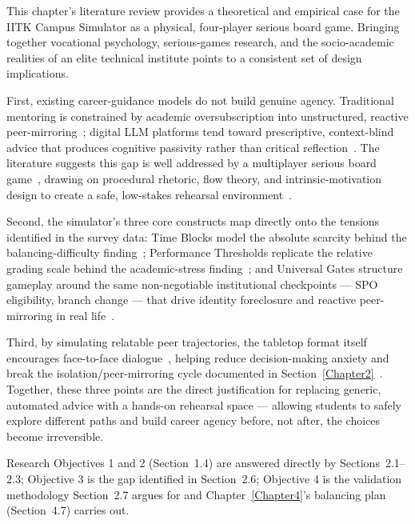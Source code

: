This chapter's literature review provides a theoretical and empirical case for the IITK Campus Simulator as a physical, four-player serious board game. Bringing together vocational psychology, serious-games research, and the socio-academic realities of an elite technical institute points to a consistent set of design implications.

First, existing career-guidance models do not build genuine agency. Traditional mentoring is constrained by academic oversubscription into unstructured, reactive peer-mirroring~\cite{Chandrasekera-2024, Yasar-2026}; digital LLM platforms tend toward prescriptive, context-blind advice that produces cognitive passivity rather than critical reflection~\cite{Yatani-2024, Du-2024}. The literature suggests this gap is well addressed by a multiplayer serious board game~\cite{Bayeck-2020, Booth-2019}, drawing on procedural rhetoric, flow theory, and intrinsic-motivation design to create a safe, low-stakes rehearsal environment~\cite{Bayeck-2020, Csikszentmihalyi-1990, Malone-1981}.

Second, the simulator's three core constructs map directly onto the tensions identified in the survey data: Time Blocks model the absolute scarcity behind the balancing-difficulty finding~\cite{Maji-2024}; Performance Thresholds replicate the relative grading scale behind the academic-stress finding~\cite{Maji-2024}; and Universal Gates structure gameplay around the same non-negotiable institutional checkpoints --- SPO eligibility, branch change --- that drive identity foreclosure and reactive peer-mirroring in real life~\cite{Maji-2024, Afreen-2022, Chandrasekera-2024}.

Third, by simulating relatable peer trajectories, the tabletop format itself encourages face-to-face dialogue~\cite{Pace-2025, Bayeck-2020}, helping reduce decision-making anxiety and break the isolation/peer-mirroring cycle documented in Section~\ref{Chapter2}~\cite{Booth-2019}. Together, these three points are the direct justification for replacing generic, automated advice with a hands-on rehearsal space --- allowing students to safely explore different paths and build career agency before, not after, the choices become irreversible.

Research Objectives 1 and 2 (Section~1.4) are answered directly by Sections~2.1--2.3; Objective 3 is the gap identified in Section~2.6; Objective 4 is the validation methodology Section~2.7 argues for and Chapter~\ref{Chapter4}'s balancing plan (Section~4.7) carries out.
